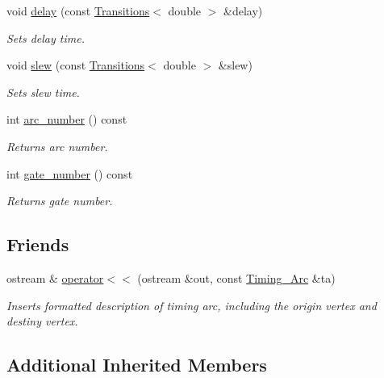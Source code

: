 \begin{DoxyCompactItemize}
void \hyperlink{classTiming__Analysis_1_1Timing__Arc_a74682f1b90b14cb0902dca32e6430fd2}{delay} (const \hyperlink{classTransitions}{Transitions}$<$ double $>$ \&delay)
\begin{DoxyCompactList}\small\item\em Sets delay time. \end{DoxyCompactList}\item 
void \hyperlink{classTiming__Analysis_1_1Timing__Arc_a5521ea0890331cb77e6b0ea72a7062a3}{slew} (const \hyperlink{classTransitions}{Transitions}$<$ double $>$ \&slew)
\begin{DoxyCompactList}\small\item\em Sets slew time. \end{DoxyCompactList}\item 
int \hyperlink{classTiming__Analysis_1_1Timing__Arc_aa4a54ed3cd6762bd26a3fdf566b5a234}{arc\-\_\-number} () const 
\begin{DoxyCompactList}\small\item\em Returns arc number. \end{DoxyCompactList}\item 
int \hyperlink{classTiming__Analysis_1_1Timing__Arc_abd085ce8fe10d00d6e0be2668773b32f}{gate\-\_\-number} () const 
\begin{DoxyCompactList}\small\item\em Returns gate number. \end{DoxyCompactList}\end{DoxyCompactItemize}
\subsection*{Friends}
\begin{DoxyCompactItemize}
\item 
ostream \& \hyperlink{classTiming__Analysis_1_1Timing__Arc_ae33a875fefadb96a5cdf5a17791c4d24}{operator$<$$<$} (ostream \&out, const \hyperlink{classTiming__Analysis_1_1Timing__Arc}{Timing\-\_\-\-Arc} \&ta)
\begin{DoxyCompactList}\small\item\em Inserts formatted description of timing arc, including the origin vertex and destiny vertex. \end{DoxyCompactList}\end{DoxyCompactItemize}
\subsection*{Additional Inherited Members}


